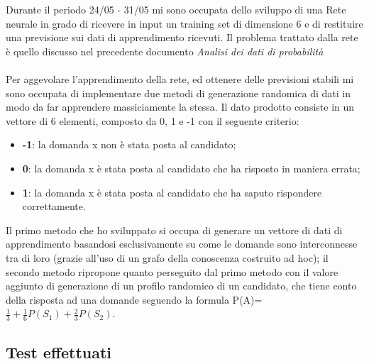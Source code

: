 \documentclass[11pt,a4paper,italian]{article}
\begin{document}
Durante il periodo 24/05 - 31/05 mi sono occupata dello sviluppo di una Rete neurale in grado di ricevere in input un training set di dimensione 6 e di restituire una previsione sui dati di apprendimento ricevuti.
\noindent
Il problema trattato dalla rete \`e quello discusso nel precedente documento \textit{Analisi dei dati di probabilit\`a}
\\\\
Per aggevolare l'apprendimento della rete, ed ottenere delle previsioni stabili mi sono occupata di implementare due metodi di generazione randomica di dati in modo da far apprendere massiciamente la stessa.
Il dato prodotto consiste in un vettore di 6 elementi, composto da 0, 1 e -1 con il seguente criterio:
\begin{itemize}
\item \textbf{-1}: la domanda x non \`e stata posta al candidato;
\item \textbf{0}: la domanda x \`e stata posta al candidato che ha risposto in maniera errata;
\item \textbf{1}: la domanda x \`e stata posta al candidato che ha saputo rispondere correttamente.
\end{itemize}
\noindent
Il primo metodo che ho sviluppato si occupa di generare un vettore di dati di apprendimento basandosi esclusivamente su come le domande sono interconnesse tra di loro (grazie all'uso di un grafo della conoscenza costruito ad hoc); il secondo metodo ripropone quanto perseguito dal primo metodo con il valore aggiunto di generazione di un profilo randomico di un candidato, che tiene conto della risposta ad una domande seguendo la formula P(A)= $\frac{1}{3}+\frac{1}{6}P(S_1)+\frac{2}{3}P(S_2)$.

\subsection{Test effettuati}
\label{Test effettuati}
\end{document}
